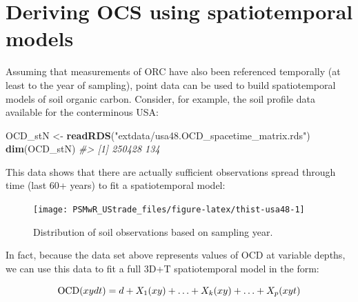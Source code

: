 \documentclass[graybox,natbib,nospthms,UStrade]{svmono}
\newenvironment{Shaded}{\begin{snugshade}}{\end{snugshade}}
\newcommand{\CommentTok}[1]{\textcolor[rgb]{0.37,0.37,0.37}{\textit{#1}}}
\newcommand{\DataTypeTok}[1]{\textcolor[rgb]{0.27,0.27,0.27}{#1}}
\newcommand{\KeywordTok}[1]{\textcolor[rgb]{0.27,0.27,0.27}{\textbf{#1}}}
\newcommand{\NormalTok}[1]{#1}
\newcommand{\OperatorTok}[1]{\textcolor[rgb]{0.43,0.43,0.43}{\textbf{#1}}}
\newcommand{\StringTok}[1]{\textcolor[rgb]{0.5,0.5,0.5}{#1}}
\begin{document}
\hypertarget{deriving-ocs-using-spatiotemporal-models}{%
\section{Deriving OCS using spatiotemporal models}\label{deriving-ocs-using-spatiotemporal-models}}

Assuming that measurements of ORC have also been referenced temporally (at least to the year of sampling), point data can be used to build spatiotemporal models of soil organic carbon. Consider, for example, the soil profile data available for the conterminous USA:

\begin{Shaded}
\begin{Highlighting}[]
\NormalTok{OCD_stN <-}\StringTok{ }\KeywordTok{readRDS}\NormalTok{(}\StringTok{"extdata/usa48.OCD_spacetime_matrix.rds"}\NormalTok{)}
\KeywordTok{dim}\NormalTok{(OCD_stN)}
\CommentTok{#> [1] 250428    134}
\end{Highlighting}
\end{Shaded}

This data shows that there are actually sufficient observations spread through time (last 60+ years) to fit a spatiotemporal model:

\begin{Shaded}
\end{Shaded}

\begin{figure}[H]

{\centering \texttt{[image: PSMwR\_UStrade\_files/figure-latex/thist-usa48-1]} 

}

\caption{Distribution of soil observations based on sampling year.}\label{fig:thist-usa48}
\end{figure}

In fact, because the data set above represents values of OCD at variable depths, we can use this data to fit a full 3D+T spatiotemporal model in the form:

\begin{equation}
{\rm OCD}(xydt) = d + X_1 (xy) + \ldots + X_k (xy) + \ldots + X_p (xyt)
\label{eq:stmodel}
\end{equation}
\end{document}
